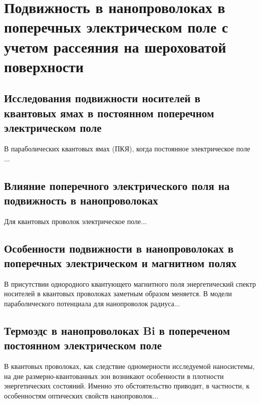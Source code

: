 \chapter{Подвижность в нанопроволоках в поперечных электрическом поле с учетом рассеяния на шероховатой поверхности} \label{chapt4}

\section{Исследования подвижности носителей в квантовых ямах в постоянном поперечном электрическом поле} \label{sect4_1}

В параболических квантовых ямах (ПКЯ), когда постоянное электрическое поле ...

\section{Влияние поперечного электрического поля на подвижность в нанопроволоках} \label{sect4_2}

Для квантовых проволок электрическое поле...

\section{Особенности подвижности в нанопроволоках в поперечных электрическом и магнитном полях} \label{sect4_3}

В присутствии однородного квантующего магнитного поля энергетический спектр носителей в квантовых проволоках заметным образом меняется. В модели параболического потенциала для нанопроволок радиуса...

\section{Термоэдс в нанопроволоках Bi в попереченом постоянном электрическом поле}\label{sect4_4}

В квантовых проволоках, как следствие одномерности исследуемой наносистемы, на дне размерно-квантованных зон возникают особенности в плотности энергетических состояний. Именно это обстоятельство приводит, в частности, к особенностям оптических свойств нанопроволок...
